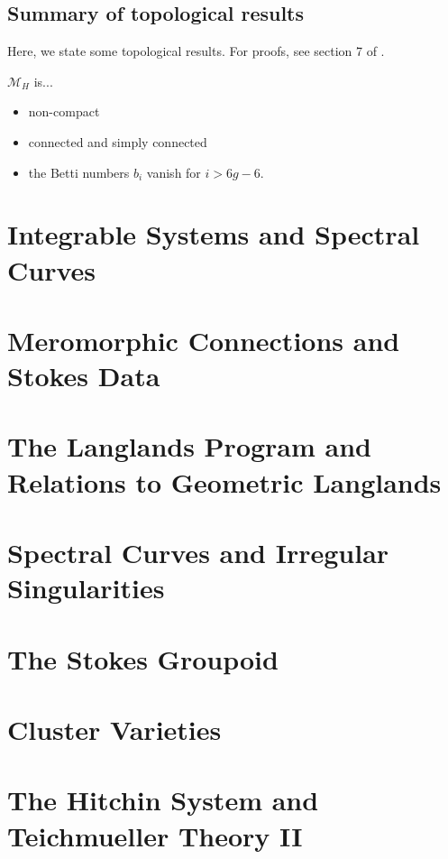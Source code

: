 \documentclass[oneside,english]{amsbook}
\numberwithin{section}{chapter}
\numberwithin{equation}{section}
\numberwithin{figure}{section}
\theoremstyle{plain}
\theoremstyle{definition}
\theoremstyle{remark}
\theoremstyle{definition}
\theoremstyle{definition}
\theoremstyle{plain}
\begin{document}
\section{Summary of topological results}

Here, we state some topological results. For proofs, see section 7
of \cite{H1}.

$\mathcal{M}_{H}$ is...
\begin{itemize}
\item non-compact
\item connected and simply connected
\item the Betti numbers $b_{i}$ vanish for $i>6g-6.$
\end{itemize}


\chapter{Integrable Systems and Spectral Curves}


\chapter{Meromorphic Connections and Stokes Data}


\chapter{The Langlands Program and Relations to Geometric Langlands}


\chapter{Spectral Curves and Irregular Singularities}


\chapter{The Stokes Groupoid}


\chapter{Cluster Varieties}


\chapter{The Hitchin System and Teichmueller Theory II}
\end{document}
